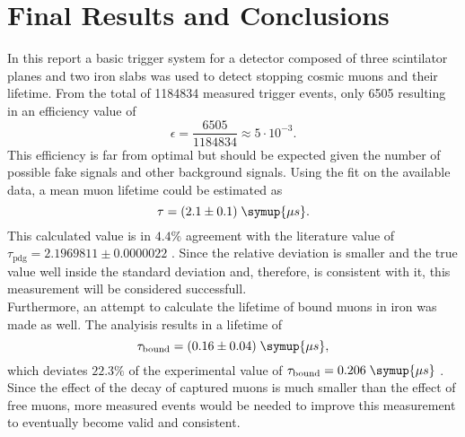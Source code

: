 \chapter{Final Results and Conclusions}
\label{sec:results}
In this report a basic 
trigger system for a detector composed of three scintilator planes and two iron slabs 
was used to detect stopping cosmic muons and their lifetime. 
From the total of 1184834 measured trigger events, only 6505 resulting in an efficiency value of 
\begin{equation*}
    \epsilon = \frac{6505}{1184834} \approx 5 \cdot 10^{-3}.
\end{equation*}
This efficiency is far from optimal but should be expected given the number of possible fake signals
and other background signals. Using the fit on the available data, a mean muon lifetime could be 
estimated as 
\begin{equation*}
    \tau = (2.1 \pm 0.1) \; \symup{\mu s}.
\end{equation*}
This calculated value is in $4.4\%$ agreement with the literature value of $\tau_{\text{pdg}} = 2.1969811 \pm 0.0000022$ \cite{pdg}.
Since the relative deviation is smaller and the true value well inside the 
standard deviation and, therefore, is consistent with it, this measurement will be considered successfull.\\
Furthermore, an attempt to calculate the lifetime of bound muons in iron was made as well. 
The analyisis results in a lifetime of 
\begin{equation*}
    \tau_{\text{bound}} = (0.16 \pm 0.04) \; \symup{\mu s},
\end{equation*}
which deviates $22.3\%$ of the experimental value of $\tau_{\text{bound}} = 0.206 \;\symup{\mu s}$ \cite{lvd}.
Since the effect of the decay of captured muons is much smaller than the effect of free 
muons, more measured events would be needed to improve this measurement to eventually
become valid and consistent.
